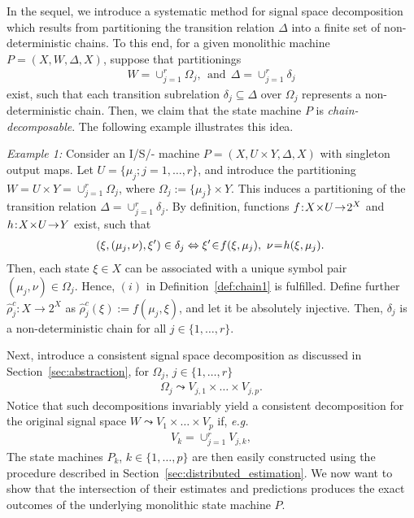 \documentclass[a4paper, 10pt, conference]{ieeeconf}
\newcommand{\eg}{\emph{e.g.}~}
\newcommand{\hspm}{\hspace{-2pt}}
\begin{document}
In the sequel, we introduce a systematic method for signal space decomposition which results from partitioning the transition relation $\Delta$ into a finite set of non-deterministic chains. To this end, for a given monolithic machine $P=(X,W,\Delta,X)$, suppose that partitionings
\begin{align}\label{eq:decomW}
W={\cup}_{j=1}^{r} \Omega_j,~~\text{and}~~\Delta = {\cup}_{j=1}^{r} \delta_j
\end{align}
exist, such that each transition subrelation $\delta_j\subseteq \Delta$ over $\Omega_j$ represents a non-deterministic chain. Then, we claim that the state machine $P$ is \emph{chain-decomposable}. The following example illustrates this idea.

\emph{Example 1:}
Consider an I/S/- machine $P=(X,U\times Y,\Delta,X)$ with singleton output maps. Let $U=\{\mu_j; j=1,\dots,r\}$, and introduce the partitioning $W=U\times Y=\cup_{j=1}^r \Omega_j$, where $\Omega_j := \{\mu_j\}\times Y$. This induces a partitioning of the transition relation $\Delta=\cup_{j=1}^r  \delta_j$. By definition, functions $f\hspm :\hspm X\hspm \times\hspm  U\hspm \to\hspm  2^X$ and $h\hspm :\hspm X\hspm \times\hspm  U\hspm \to\hspm  Y$ exist, such that
\begin{align}\label{eq:isminus}
\hspm(\xi,(\mu_j,\nu),\xi^\prime)\in\delta_j \Leftrightarrow \xi'\hspm\in \hspm f(\xi,\mu_j),~\nu\hspm =\hspm h(\xi,\mu_j).
\end{align}
Then, each state $\xi\in X$ can be associated with a unique symbol pair $(\mu_j,\nu)\in \Omega_j$. Hence, $(i)$ in Definition~\ref{def:chain1} is fulfilled. Define further $\hat\rho^c_j:X \to 2^X$ as $\hat\rho^c_j(\xi):=f(\mu_j,\xi)$, and let it be absolutely injective. Then, $\delta_j$ is a non-deterministic chain for all $j\in\{1,\dots,r\}$.~\QED


Next, introduce a consistent signal space decomposition as discussed in Section~\ref{sec:abstraction}, for $\Omega_j$, $j\in\{1,\dots,r\}$
\begin{align}
\label{eq:decomp_chains}
\Omega_j \leadsto V_{j,1}\times\dots\times V_{j,p}.
\end{align}
Notice that such decompositions invariably yield a consistent decomposition  for the original signal space $W\leadsto V_1\times\dots\times V_p$ if, \eg
\begin{align}\label{eq:Qk_chains}
V_k = {\cup}_{j=1}^{r} V_{j,k},
\end{align}
The state machines $P_k$, $k\in\{1,\ldots,p\}$ are then easily constructed using the procedure described in Section~\ref{sec:distributed_estimation}. We now want to show that the intersection of their estimates and predictions produces the exact outcomes of the underlying monolithic state machine $P$.
\end{document}
